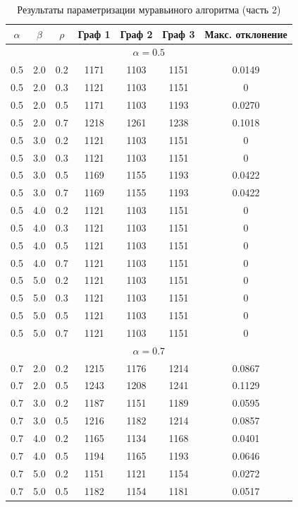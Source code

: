 \begin{table}[h!]
	\centering
	\caption{Результаты параметризации муравьиного алгоритма (часть 2)}
	\label{tab:param-full-2}
	\renewcommand{\arraystretch}{1.2}
	\small
	\begin{tabular}{|c|c|c|c|c|c|c|}
		\hline
		$\alpha$ & $\beta$ & $\rho$ & Граф 1 & Граф 2 & Граф 3 & Макс. отклонение \\ \hline
		\hline
		\multicolumn{7}{|c|}{\textbf{$\alpha = 0.5$}} \\ \hline
		0.5 & 2.0 & 0.2 & 1171 & 1103 & 1151 & 0.0149 \\ \hline
		0.5 & 2.0 & 0.3 & 1121 & 1103 & 1151 & 0 \\ \hline
		0.5 & 2.0 & 0.5 & 1171 & 1103 & 1193 & 0.0270 \\ \hline
		0.5 & 2.0 & 0.7 & 1218 & 1261 & 1238 & 0.1018 \\ \hline
		0.5 & 3.0 & 0.2 & 1121 & 1103 & 1151 & 0 \\ \hline
		0.5 & 3.0 & 0.3 & 1121 & 1103 & 1151 & 0 \\ \hline
		0.5 & 3.0 & 0.5 & 1169 & 1155 & 1193 & 0.0422 \\ \hline
		0.5 & 3.0 & 0.7 & 1169 & 1155 & 1193 & 0.0422 \\ \hline
		0.5 & 4.0 & 0.2 & 1121 & 1103 & 1151 & 0 \\ \hline
		0.5 & 4.0 & 0.3 & 1121 & 1103 & 1151 & 0 \\ \hline
		0.5 & 4.0 & 0.5 & 1121 & 1103 & 1151 & 0 \\ \hline
		0.5 & 4.0 & 0.7 & 1121 & 1103 & 1151 & 0 \\ \hline
		0.5 & 5.0 & 0.2 & 1121 & 1103 & 1151 & 0 \\ \hline
		0.5 & 5.0 & 0.3 & 1121 & 1103 & 1151 & 0 \\ \hline
		0.5 & 5.0 & 0.5 & 1121 & 1103 & 1151 & 0 \\ \hline
		0.5 & 5.0 & 0.7 & 1121 & 1103 & 1151 & 0 \\ \hline
		\hline
		\multicolumn{7}{|c|}{\textbf{$\alpha = 0.7$}} \\ \hline
		0.7 & 2.0 & 0.2 & 1215 & 1176 & 1214 & 0.0867 \\ \hline
		0.7 & 2.0 & 0.5 & 1243 & 1208 & 1241 & 0.1129 \\ \hline
		0.7 & 3.0 & 0.2 & 1187 & 1151 & 1189 & 0.0595 \\ \hline
		0.7 & 3.0 & 0.5 & 1216 & 1182 & 1214 & 0.0857 \\ \hline
		0.7 & 4.0 & 0.2 & 1165 & 1134 & 1168 & 0.0401 \\ \hline
		0.7 & 4.0 & 0.5 & 1194 & 1165 & 1193 & 0.0646 \\ \hline
		0.7 & 5.0 & 0.2 & 1151 & 1121 & 1154 & 0.0272 \\ \hline
		0.7 & 5.0 & 0.5 & 1182 & 1154 & 1181 & 0.0517 \\ \hline
	\end{tabular}
\end{table}
